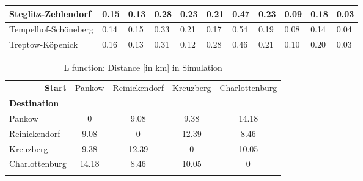 \begin{sidewaystable}
\begin{tabularx}{\textwidth}{|p{3cm}|*{5}X|*{5}X|}
  Steglitz-Zehlendorf        &           0.15 &        0.13 &        0.28 &        0.23 &          0.21 &             0.47 &  0.23 &           0.09 &                  0.18 &                  0.03 \\\hline
  Tempelhof-Schöneberg       &           0.14 &        0.15 &        0.33 &        0.21 &          0.17 &             0.54 &  0.19 &           0.08 &                  0.14 &                  0.04 \\\hline
  Treptow-Köpenick           &           0.16 &        0.13 &        0.31 &        0.12 &          0.28 &             0.46 &  0.21 &           0.10 &                  0.20 &                  0.03 \\\hline
\end{tabularx}

\end{sidewaystable}

\begin{longtable}{ | l | c  c  c  c |}
  \hline
  \multicolumn{1}{|r|}{\textbf{Start}} & Pankow & Reinickendorf & Kreuzberg & Charlottenburg \\
  \textbf{Destination} & {} & {} & {} & {} \\\hline
  Pankow & 0 & 9.08 & 9.38 & 14.18 \\
  Reinickendorf & 9.08 & 0 & 12.39 & 8.46 \\
  Kreuzberg & 9.38 & 12.39 & 0 & 10.05 \\
  Charlottenburg & 14.18 & 8.46 & 10.05 & 0 \\
  
  \hline

  \caption{L function: Distance [in km] in Simulation}
  \label{table:Distance}
\end{longtable}
